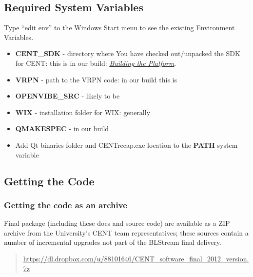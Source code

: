 \documentclass[letterpaper,10pt,english]{sphinxmanual}
\begin{document}
\subsection{\textbf{Required System Variables}}
\label{index:required-system-variables}\label{index:req-sys-vars}
Type ``edit env'' to the Windows Start menu to see the existing Environment Variables.
\begin{itemize}
\item {} 
\textbf{CENT\_SDK} - directory where You have checked out/unpacked the SDK for CENT: this is  in our build: {\hyperref[index:build-plat]{\emph{Building the Platform}}}.

\item {} 
\textbf{VRPN} - path to the VRPN code: in our build this is 

\item {} 
\textbf{OPENVIBE\_SRC} - likely to be 

\item {} 
\textbf{WIX} - installation folder for WIX: generally 

\item {} 
\textbf{QMAKESPEC} - in our build 

\item {} 
Add Qt binaries folder and CENTrecap.exe location to the \textbf{PATH} system variable

\end{itemize}


\subsection{\textbf{Getting the Code}}
\label{index:getting-the-code}\label{index:get-code}

\subsubsection{\textbf{Getting the code as an archive}}
\label{index:getting-the-code-as-an-archive}
Final package (including these docs and source code) are available as a ZIP archive from the University's CENT team representatives; these sources contain a number of incremental upgrades not part of the BLStream final delivery.
\begin{quote}

\href{https://dl.dropbox.com/u/88101646/CENT\_software\_final\_2012\_version.7z}{https://dl.dropbox.com/u/88101646/CENT\_software\_final\_2012\_version.7z}
\end{quote}
\end{document}
